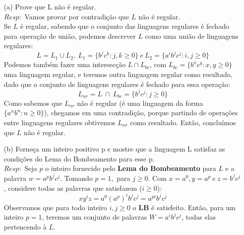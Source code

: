 \documentclass{homework}
\begin{document}
	\begin{itemize}
		\item[(a)] Prove que L não é regular.\\
		$Resp:$ Vamos provar por contradição que $L$ não é regular.\\
			Se $L$ é regular, sabendo que o conjunto das linguagens regulares é fechado para operação de união, podemos descrever $L$ como uma união de linguagens regulares: 
			\[L = L_1 \cup L_2,\ L_1 = \{b^j c^k:j,k \geq 0\}\ e\ L_2 = \{a^i b^j c^j:i,j \geq 0\}\] 
			Podemos também fazer uma intersecção $L \cap L_{bc}$, com $L_{bc} = \{b^x c^y:x,y \geq 0\}$ uma linguagem regular, e teremos outra linguagem regular como resultado, dado que o conjunto de linguagens regulares é fechado para essa operação:
			\[L_{nr} = L\ \cap\ L_{bc} = \{b^j c^j:j \geq 0\}\]
			Como sabemos que $L_{nr}$ não é regular (é uma linguagem da forma $\{a^nb^n:n \geq 0\}$), chegamos em uma contradição, porque partindo de operações entre linguagens regulares obtivemos $L_{nr}$ como resultado. Então, concluímos que $L$ não é regular.
	\end{itemize}
	\begin{itemize}
		\item[(b)] Forneça um inteiro positivo p e mostre que a linguagem L satisfaz
as condições do Lema do Bombeamento para esse p.\\
		$Resp:$ Seja $p$ o inteiro fornecido pelo \textbf{Lema do Bombeamento} para $L$ e a palavra $w = a^pb^jc^j$. Tomando $p = 1,$ para $j \geq 0$. Com $x = a^0, y = a^p\ e\ z = b^j c^j$, considere todas as palavras que satisfazem ($i \geq 0$):
			\[xy^iz = a^0(a^{p})^i b^j c^j = a^{pi} b^j c^j\]
		Observamos que para todo inteiro $i,j \geq 0$ o \textbf{LB} é satisfeito. Então, para um inteiro $p = 1$, teremos um conjunto de palavras $W = a^{i} b^j c^j$, todas elas pertencendo à $L$.
	\end{itemize}
\end{document}
